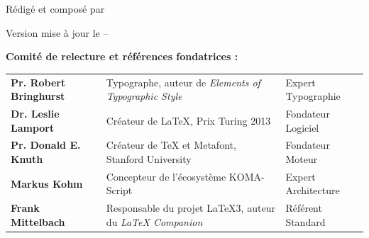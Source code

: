 \begin{titlepage}
\begin{center}
    {\fontsize{11}{14}\selectfont\color{ThesisMuted}Rédigé et composé par}\par
    \vspace{3mm}
    {\fontsize{14.4}{18}\selectfont\bfseries\color{ThesisPrimary}\getauthor}\par
    \vspace{4mm}
    {\fontsize{10}{13}\selectfont\color{ThesisMuted}Version mise à jour le \getdate{} -- \getlocation}\par
  \end{center}

  \vfill

  \noindent
  {\small\bfseries\color{ThesisPrimary}Comité de relecture et références fondatrices :}\par
  \vspace{3mm}
  \noindent
  \begin{tabularx}{\textwidth}{@{} >{\bfseries}p{4.2cm} >{\raggedright\arraybackslash}X >{\raggedleft\arraybackslash}p{4.0cm} @{}}
    \toprule
    Pr. Robert Bringhurst & Typographe, auteur de \textit{Elements of Typographic Style} & Expert Typographie \\
    Dr. Leslie Lamport    & Créateur de \LaTeX{}, Prix Turing 2013                       & Fondateur Logiciel \\
    Pr. Donald E. Knuth   & Créateur de \TeX{} et Metafont, Stanford University          & Fondateur Moteur \\
    Markus Kohm           & Concepteur de l'écosystème KOMA-Script                       & Expert Architecture \\
    Frank Mittelbach      & Responsable du projet \LaTeX3, auteur du \textit{\LaTeX{} Companion} & Référent Standard \\
    \bottomrule
  \end{tabularx}

\end{titlepage}

